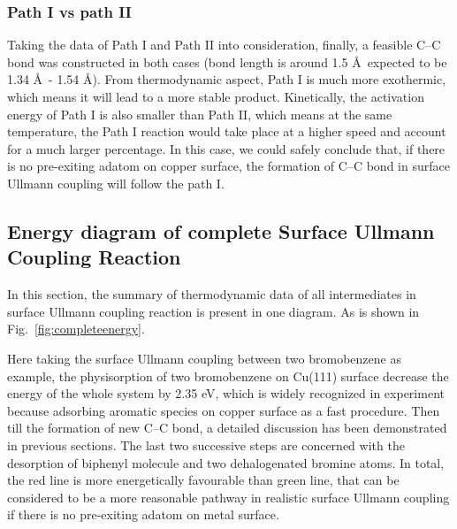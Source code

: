 \documentclass[%
 reprint,
 amsmath,amssymb,
 aps,
prb,
]{revtex4-2}
\begin{document}
\subsubsection{Path I vs path II}

Taking the data of Path I and Path II into consideration, finally, a feasible C--C bond was constructed in both cases (bond length is around 1.5 \AA\, expected to be 1.34 \AA\ - 1.54 \AA). From thermodynamic aspect, Path I is much more exothermic, which means it will lead to a more stable product. Kinetically, the activation energy of Path I is also smaller than Path II, which means at the same temperature, the Path I reaction would take place at a higher speed and account for a much larger percentage. In this case, we could safely conclude that, if there is no pre-exiting adatom on copper surface, the formation of C--C bond in surface Ullmann coupling will follow the path I.





\subsection{Energy diagram of complete Surface Ullmann Coupling Reaction}
In this section, the summary of thermodynamic data of all intermediates in surface Ullmann coupling reaction is present in one diagram. As is shown in Fig.~\ref{fig:completeenergy}.

Here taking the surface Ullmann coupling between two bromobenzene as example, the physisorption of two bromobenzene on Cu(111) surface decrease the energy of the whole system by 2.35 eV, which is widely recognized in experiment because adsorbing aromatic species on copper surface as a fast procedure. 
Then till the formation of new C--C bond, a detailed discussion has been demonstrated in previous sections. The last two successive steps are concerned with the desorption of biphenyl molecule and two dehalogenated bromine atoms. 
In total, the red line is more energetically favourable than green line, that can be considered to be a more reasonable pathway in realistic surface Ullmann coupling if there is no pre-exiting adatom on metal surface.
\end{document}
